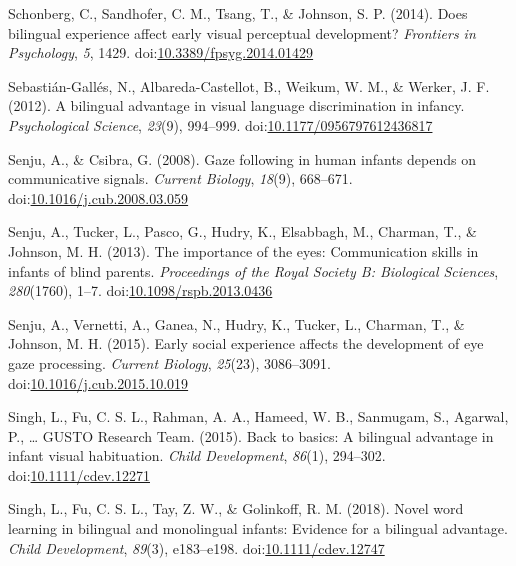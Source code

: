 \documentclass[,man,floatsintext]{apa6}
\begin{document}
\leavevmode\hypertarget{ref-Schonberg_etal_2014}{}%
Schonberg, C., Sandhofer, C. M., Tsang, T., \& Johnson, S. P. (2014). Does bilingual experience affect early visual perceptual development? \emph{Frontiers in Psychology}, \emph{5}, 1429. doi:\href{https://doi.org/10.3389/fpsyg.2014.01429}{10.3389/fpsyg.2014.01429}

\leavevmode\hypertarget{ref-Sebastian-Galles_etal_2012}{}%
Sebastián-Gallés, N., Albareda-Castellot, B., Weikum, W. M., \& Werker, J. F. (2012). A bilingual advantage in visual language discrimination in infancy. \emph{Psychological Science}, \emph{23}(9), 994--999. doi:\href{https://doi.org/10.1177/0956797612436817}{10.1177/0956797612436817}

\leavevmode\hypertarget{ref-Senju_Csibra_2008}{}%
Senju, A., \& Csibra, G. (2008). Gaze following in human infants depends on communicative signals. \emph{Current Biology}, \emph{18}(9), 668--671. doi:\href{https://doi.org/10.1016/j.cub.2008.03.059}{10.1016/j.cub.2008.03.059}

\leavevmode\hypertarget{ref-Senju_etal_2013}{}%
Senju, A., Tucker, L., Pasco, G., Hudry, K., Elsabbagh, M., Charman, T., \& Johnson, M. H. (2013). The importance of the eyes: Communication skills in infants of blind parents. \emph{Proceedings of the Royal Society B: Biological Sciences}, \emph{280}(1760), 1--7. doi:\href{https://doi.org/10.1098/rspb.2013.0436}{10.1098/rspb.2013.0436}

\leavevmode\hypertarget{ref-Senju_etal_2015}{}%
Senju, A., Vernetti, A., Ganea, N., Hudry, K., Tucker, L., Charman, T., \& Johnson, M. H. (2015). Early social experience affects the development of eye gaze processing. \emph{Current Biology}, \emph{25}(23), 3086--3091. doi:\href{https://doi.org/10.1016/j.cub.2015.10.019}{10.1016/j.cub.2015.10.019}

\leavevmode\hypertarget{ref-Singh_etal_2015}{}%
Singh, L., Fu, C. S. L., Rahman, A. A., Hameed, W. B., Sanmugam, S., Agarwal, P., \ldots{} GUSTO Research Team. (2015). Back to basics: A bilingual advantage in infant visual habituation. \emph{Child Development}, \emph{86}(1), 294--302. doi:\href{https://doi.org/10.1111/cdev.12271}{10.1111/cdev.12271}

\leavevmode\hypertarget{ref-Singh_etal_2018}{}%
Singh, L., Fu, C. S. L., Tay, Z. W., \& Golinkoff, R. M. (2018). Novel word learning in bilingual and monolingual infants: Evidence for a bilingual advantage. \emph{Child Development}, \emph{89}(3), e183--e198. doi:\href{https://doi.org/10.1111/cdev.12747}{10.1111/cdev.12747}
\end{document}
